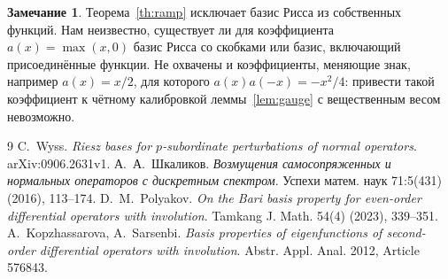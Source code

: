 \documentclass[12pt,a4paper]{article}
\theoremstyle{definition}
\newtheorem{remark}{Замечание}
\begin{document}
\begin{remark}\label{rem:open}
Теорема~\ref{th:ramp} исключает базис Рисса из собственных функций. Нам неизвестно,
существует ли для коэффициента $a(x)=\max(x,0)$ базис Рисса со скобками или базис,
включающий присоединённые функции. Не охвачены и коэффициенты, меняющие знак, например
$a(x)=x/2$, для которого $a(x)a(-x)=-x^2/4$: привести такой коэффициент к чётному
калибровкой леммы~\ref{lem:gauge} с вещественным весом невозможно.
\end{remark}

\begin{thebibliography}{9}
C.~Wyss. \emph{Riesz bases for $p$-subordinate perturbations of normal operators}.
arXiv:0906.2631v1.
А.~А.~Шкаликов. \emph{Возмущения самосопряженных и нормальных операторов с дискретным
спектром}. Успехи матем. наук 71:5(431) (2016), 113--174.
D.~M.~Polyakov. \emph{On the Bari basis property for even-order differential operators
with involution}. Tamkang J. Math. 54(4) (2023), 339--351.
A.~Kopzhassarova, A.~Sarsenbi. \emph{Basis properties of eigenfunctions of second-order
differential operators with involution}. Abstr. Appl. Anal. 2012, Article 576843.
\end{thebibliography}
\end{document}
